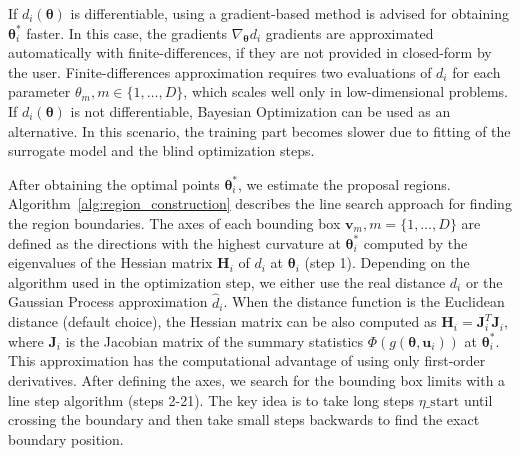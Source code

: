 \documentclass[nojss]{jss}
\newcommand{\vb}{\mathbf{v}}
\newcommand{\ub}{\mathbf{u}}
\newcommand{\jac}{\mathbf{J}}
\newcommand{\hessian}{\mathbf{H}}
\newcommand{\thetab}{\boldsymbol{\theta}}
\begin{document}
If \(d_i(\thetab)\) is differentiable, using a gradient-based method
is advised for obtaining \(\thetab_i^*\) faster. In this case, the
gradients \(\nabla_{\thetab} d_i\) gradients are approximated
automatically with finite-differences, if they are not provided in
closed-form by the user. Finite-differences approximation requires two
evaluations of \(d_i\) for each parameter
\(\theta_m, m \in \{1, \ldots, D\}\), which scales well only in
low-dimensional problems. If \(d_i(\thetab)\) is not differentiable,
Bayesian Optimization can be used as an alternative. In this scenario,
the training part becomes slower due to fitting of the surrogate model
and the blind optimization steps.

After obtaining the optimal points \(\thetab^*_i\), we estimate the
proposal regions. Algorithm~\ref{alg:region_construction} describes
the line search approach for finding the region boundaries. The axes
of each bounding box \(\vb_m, m = \{1, \ldots, D\}\) are defined as
the directions with the highest curvature at \(\thetab_i^*\) computed
by the eigenvalues of the Hessian matrix \(\hessian_i\) of \(d_i\) at
\(\thetab_i\) (step 1). Depending on the algorithm used in the
optimization step, we either use the real distance \(d_i\) or the
Gaussian Process approximation \(\hat{d}_i\). When the distance
function is the Euclidean distance (default choice), the Hessian
matrix can be also computed as \(\hessian_i = \jac_i^T\jac_i\), where
\(\jac_i\) is the Jacobian matrix of the summary statistics
\(\Phi(g(\thetab, \ub_i))\) at \(\thetab_i^*\). This approximation has
the computational advantage of using only first-order
derivatives. After defining the axes, we search for the bounding box
limits with a line step algorithm (steps 2-21). The key idea is to
take long steps \(\eta\_\text{start}\) until crossing the boundary and
then take small steps backwards to find the exact boundary position.
\end{document}
